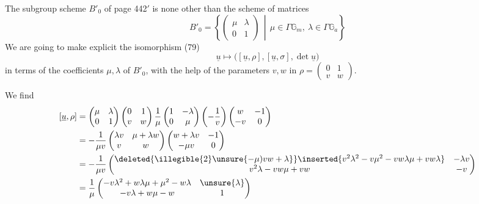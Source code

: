 The subgroup scheme $B'_0$ of page 442$'$ is none other than the scheme of matrices
\[
B'_0=\left\{\begin{pmatrix}\mu&\lambda\\0&1\end{pmatrix}
\,\middle|\,\mu\in\Gamma\mathbb G_m,\ \lambda\in\Gamma\mathbb G_a\right\} \tag{44}
\]
We are going to make explicit the isomorphism (79)
\[
\underline u\longmapsto\bigl([\underline u,\rho],[\underline u,\sigma],\det\underline u\bigr) \tag{45}
\]
in terms of the coefficients $\mu,\lambda$ of $B'_0$, with the help of the parameters
$v,w$ in $\rho=\begin{pmatrix}0&1\\v&w\end{pmatrix}$.


We find
\[
\begin{aligned}
{}[\underline u,\rho]
&=\begin{pmatrix}\mu&\lambda\\0&1\end{pmatrix}
\begin{pmatrix}0&1\\v&w\end{pmatrix}
\frac1\mu\begin{pmatrix}1&-\lambda\\0&\mu\end{pmatrix}
\left(-\frac1v\right)\begin{pmatrix}w&-1\\-v&0\end{pmatrix}\\
&=-\frac1{\mu v}\begin{pmatrix}\lambda v&\mu+\lambda w\\v&w\end{pmatrix}
\begin{pmatrix}w+\lambda v&-1\\-\mu v&0\end{pmatrix}\\
&=-\frac1{\mu v}
\begin{pmatrix}
\deleted{\illegible{2}\unsure{-\mu)vw+\lambda}}\inserted{v^2\lambda^2-v\mu^2-vw\lambda\mu+vw\lambda}&-\lambda v\\
v^2\lambda-vw\mu+vw&-v
\end{pmatrix}\\
&=\frac1\mu\begin{pmatrix}
-v\lambda^2+w\lambda\mu+\mu^2-w\lambda&\unsure{\lambda}\\
-v\lambda+w\mu-w&1
\end{pmatrix}
\end{aligned}
\]

